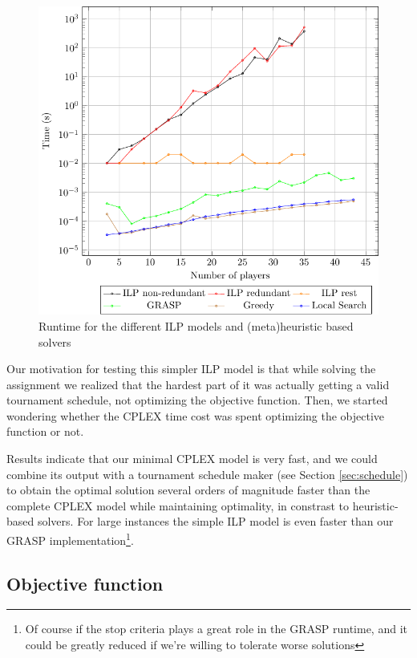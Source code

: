 \documentclass[a4paper, 10pt]{article}
\begin{document}
\begin{figure}[H]
    \centering
    \includegraphics[width=\linewidth]{plots/times.pdf}
    \caption{Runtime for the different ILP models and (meta)heuristic based solvers}
    \label{fig:time}
\end{figure}
Our motivation for testing this simpler ILP model is that while solving the assignment we realized that the hardest part of it was actually getting a valid tournament schedule, not optimizing the objective function. Then, we started wondering whether the CPLEX time cost was spent optimizing the objective function or not. 

Results indicate that our minimal CPLEX model is very fast, and we could combine its output with a tournament schedule maker (see Section \ref{sec:schedule}) to obtain the optimal solution several orders of magnitude faster than the complete CPLEX model while maintaining optimality, in constrast to heuristic-based solvers. For large instances the simple ILP model is even faster than our GRASP implementation\footnote{Of course if the stop criteria plays a great role in the GRASP runtime, and it could be greatly reduced if we're willing to tolerate worse solutions}. 


\clearpage


\clearpage
\subsection{Objective function}
\end{document}
